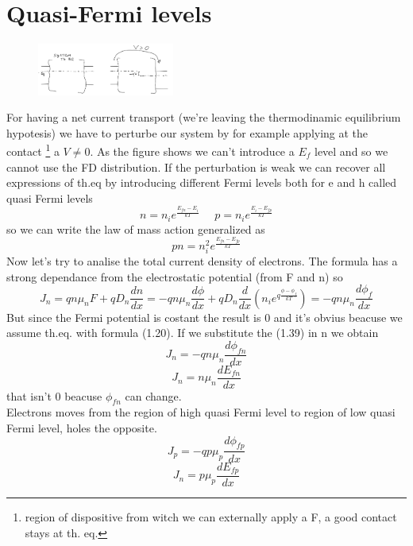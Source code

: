 \section{Quasi-Fermi levels}

\begin{figure}
\includegraphics[width=0.4\textwidth]{perturbation.png}
\end{figure}

For having a net current transport (we're leaving the thermodinamic equilibrium hypotesis) we have to perturbe our system by for example applying at the contact \footnote{region of dispositive from witch we can externally apply a F, a good contact stays at th. eq.} a $V\neq 0$. 
As the figure shows  we can't introduce a $E_f$ level and so we cannot use the FD distribution. If the perturbation is weak we can recover all expressions of th.eq by introducing different Fermi levels both for e and h called quasi Fermi levels
\begin{equation}
n=n_ie^{\frac{E_{fn}-E_i}{kT}} \ \ \ \ \ \ p=n_ie^{\frac{E_i-E_{fp}}{kT}}
\end{equation}
so we can write the law of mass action generalized as 
\begin{equation}
pn=n_i^2e^{\frac{E_{fn}-E_{fp}}{kT}}
\end{equation}
Now let's try to analise the total current density of electrons. The formula has a strong dependance from the electrostatic potential (from F and n) so
\begin{equation}
J_n=qn\mu_nF+qD_n\frac{dn}{dx}=-qn\mu_n\frac{d\phi}{dx}+qD_n\frac{d}{dx}\left(n_ie^{q\frac{\phi-\phi_f}{kT}}\right)=-qn\mu_n\frac{d\phi_f}{dx}
\end{equation} 
But since the Fermi potential is costant the result is 0 and it's obvius beacuse we assume th.eq. with formula (1.20).
If we substitute the (1.39) in n we obtain
\begin{equation}
J_n=-qn\mu_n\frac{d\phi_{fn}}{dx}
\end{equation}
\begin{equation}
J_n=n\mu_n\frac{dE_{fn}}{dx}
\end{equation}  
that isn't 0 beacuse $\phi_{fn}$ can change.\\
Electrons moves from the region of high quasi Fermi level to region of low quasi Fermi level, holes the opposite.
\begin{equation}
J_p=-qp\mu_p\frac{d\phi_{fp}}{dx}
\end{equation}
\begin{equation}
J_n=p\mu_p\frac{dE_{fp}}{dx}
\end{equation}  
\newline
